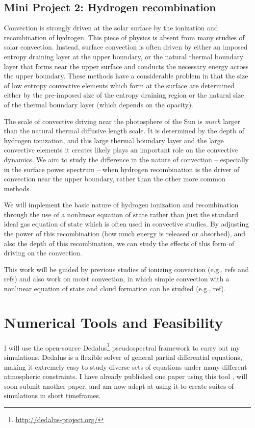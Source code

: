 \documentclass[aasms,12pt]{article}
\begin{document}
\subsection{Mini Project 2: Hydrogen recombination}
Convection is strongly driven at the solar surface by the ionization and recombination of hydrogen.
This piece of physics is absent from many studies of solar convection. Instead, surface convection
is often driven by either an imposed entropy draining layer at the upper boundary, or the natural
thermal boundary layer that forms near the upper surface and conducts the necessary energy across
the upper boundary.  These methods have a considerable problem in that the size of low entropy
convective elements which form at the surface are determined either by the pre-imposed size of the
entropy draining region or the natural size of the thermal boundary layer (which depends on
the opacity).

The scale of convective driving near the photosphere of the Sun is \emph{much} larger than the
natural thermal diffusive length scale. It is determined by the depth of hydrogen ionization,
and this large thermal boundary layer and the large convective elements it creates likely
plays an important role on the convective dynamics. We aim to study the difference in the 
nature of convection -- especially in the surface power spectrum -- when hydrogen recombination
is the driver of convection near the upper boundary, rather than the other more common methods.

We will implement the basic nature of hydrogen ionization and recombination through the use of
a nonlinear equation of state rather than just the standard ideal gas equation of state which
is often used in convective studies.  By adjusting the power of this recombination (how much
energy is released or absorbed), and also the depth of this recombination, we can study the
effects of this form of driving on the convection.

This work will be guided by previous studies of ionizing convection (e.g., refs and refs)
and also work on moist convection, in which simple convection with a nonlinear equation of
state and cloud formation can be studied (e.g., ref).

\section{Numerical Tools and Feasibility}
I will use the open-source Dedalus\footnote{\url{http://dedalus-project.org/}} pseudospectral framework 
\cite{burns&all2016} to carry out my simulations.  
Dedalus is a flexible solver of general partial differential equations,
making it extremely easy to study diverse sets of equations under many different atmospheric
constraints.  I have already published one paper using this tool \citep{anders&brown2017},
will soon submit another paper, and am now adept at using it to create suites of simulations
in short timeframes.
\end{document}
